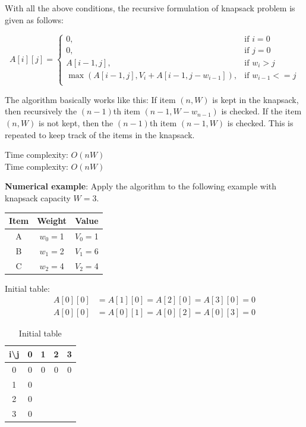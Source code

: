 \documentclass[a4paper,11pt]{book}
\begin{document}
\noindent With all the above conditions, the recursive formulation of knapsack problem is given as follows:

\[
    A[i][j]= 
\begin{cases}
    0, & \text{if } i=0\\
    0, & \text{if } j=0\\
    A[i-1,j], & \text{if } w_i > j\\
    \max(A[i-1,j], V_i + A[i-1,j-w_{i-1}]), & \text{if } w_{i-1} <= j\\
\end{cases}
\]

\noindent The algorithm basically works like this: If item $(n,W)$ is kept in the knapsack, then recursively the $(n-1)$th item $(n-1, W-w_{n-1})$ is checked. If the item $(n,W)$ is not kept, then the $(n-1)$th item $(n-1, W)$ is checked. This is repeated to keep track of the items in the knapsack.

\vspace{5mm}

\noindent Time complexity: $O(nW)$\\
\noindent \noindent Time complexity: $O(nW)$

\vspace{3mm}

\noindent \textbf{Numerical example}: Apply the algorithm to the following example with knapsack capacity $W=3$.
\begin{table}[ht]
\centering
\begin{tabular}{|c|c|c|}
\hline
Item & Weight & Value \\ \hline
A    & $w_0=$1      & $V_0=$1     \\
B    & $w_1=$2      & $V_1=$6     \\
C    & $w_2=$4      & $V_2=$4 \\
\hline
\end{tabular}
\end{table}

\noindent Initial table:
\begin{align*}
    A[0][0] &= A[1][0] = A[2][0] = A[3][0] = 0\\
    A[0][0] &= A[0][1] = A[0][2] = A[0][3] = 0
\end{align*}

\begin{table}[ht]
\centering
\begin{tabular}{|c|c|c|c|c|}
\hline
i\textbackslash{}j & 0 & 1 & 2 & 3 \\ \hline
0                  & 0 & 0 & 0 & 0 \\ \hline
1                  & 0 &   &   &   \\ \hline
2                  & 0 &   &   &   \\ \hline
3                  & 0 &   &   &   \\ \hline
\end{tabular}
\caption*{Initial table}
\end{table}
\end{document}
